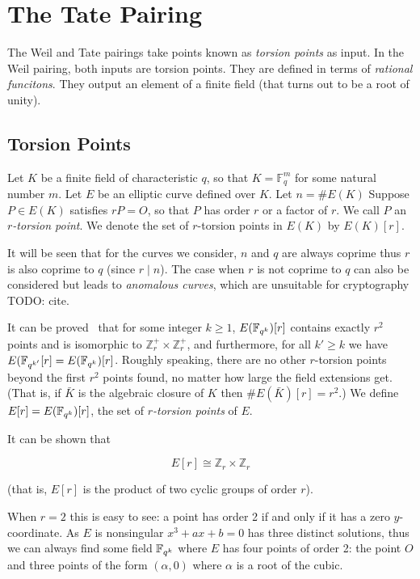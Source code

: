 \chapter {The Tate Pairing}

The Weil and Tate pairings take points known as \emph{torsion points}
as input. In the Weil pairing, both inputs are torsion points.
They are defined in terms of \emph{rational funcitons}.
They output an element of a finite field (that turns out to be a root of unity).

\section {Torsion Points}

Let $K$ be a finite field of characteristic $q$, so that
$K = \mathbb{F}_q^m$ for some natural number $m$.
Let $E$ be an elliptic curve defined
over $K$. Let $n=\#E(K)$
Suppose $P\in E(K)$ satisfies $r P = O$, so that $P$ has order $r$ or a
factor of $r$.
We call $P$ an \emph{$r$-torsion point}.
We denote the set of $r$-torsion points in $E(K)$ by
$E(K)[r]$.

It will be seen that for the curves we consider,
$n$ and $q$ are always coprime thus $r$ is also coprime to $q$
(since $r \mid n$).
The case when $r$ is not coprime
to $q$ can also be considered but leads to \emph{anomalous curves},
which are unsuitable for cryptography TODO: cite.

It can be proved~\cite{silverman} that for some integer $k \ge 1$,
$E(\mathbb{F}_{q^k})[r]$ contains exactly $r^2$ points and is isomorphic to
$\mathbb{Z}_r^+ \times \mathbb{Z}_r^+$,
and furthermore, for all $k' \ge k$ we have $E(\mathbb{F}_{q^{k'}} [r]
= E(\mathbb{F}_{q^k})[r]$.
Roughly speaking, there are no other $r$-torsion points beyond the
first $r^2$ points found, no matter how large the field extensions get.
(That is, if $\bar{K}$ is the algebraic closure of $K$ then $\#E(\bar{K})[r] = r^2$.)
We define $E[r] = E(\mathbb{F}_{q^k})[r]$, the set of
\emph{$r$-torsion points} of $E$.

It can be shown that

\[ E[r] \cong \mathbb{Z}_r \times \mathbb{Z}_r \]

(that is, $E[r]$ is the product of two cyclic groups of order $r$).

When $r=2$ this is easy to see: a point has order 2 if and only if it has
a zero $y$-coordinate. As $E$ is nonsingular
$x^3 + ax + b = 0$ has three distinct solutions, thus we can always find
some field $\mathbb{F}_{q^k}$ where $E$ has
four points of order 2: the point $O$ and three points of the form
$(\alpha, 0)$ where $\alpha$ is a root of the cubic.


